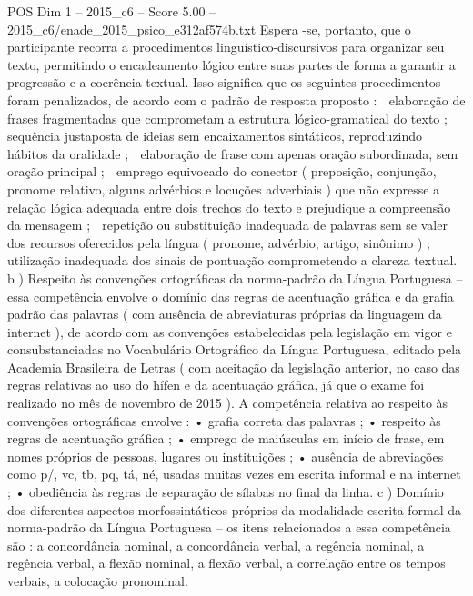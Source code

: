 \begin{textsample}{POS Dim 1 – 2015\_c6 – Score 5.00 – 2015\_c6/enade\_2015\_psico\_e312af574b.txt}
Espera -se, portanto, que o participante recorra a procedimentos linguístico-discursivos para organizar seu texto, permitindo o encadeamento lógico entre suas partes de forma a garantir a progressão e a coerência textual.
Isso significa que os seguintes procedimentos foram penalizados, de acordo com o padrão de resposta proposto :  elaboração de frases fragmentadas que comprometam a estrutura lógico-gramatical do texto ;  sequência justaposta de ideias sem encaixamentos sintáticos, reproduzindo hábitos da oralidade ;  elaboração de frase com apenas oração subordinada, sem oração principal ;  emprego equivocado do conector ( preposição, conjunção, pronome relativo, alguns advérbios e locuções adverbiais ) que não expresse a relação lógica adequada entre dois trechos do texto e prejudique a compreensão da mensagem ;  repetição ou substituição inadequada de palavras sem se valer dos recursos oferecidos pela língua ( pronome, advérbio, artigo, sinônimo ) ;  utilização inadequada dos sinais de pontuação comprometendo a clareza textual. b ) Respeito às convenções ortográficas da norma-padrão da Língua Portuguesa – essa competência envolve o domínio das regras de acentuação gráfica e da grafia padrão das palavras ( com ausência de abreviaturas próprias da linguagem da internet ), de acordo com as convenções estabelecidas pela legislação em vigor e consubstanciadas no Vocabulário Ortográfico da Língua Portuguesa, editado pela Academia Brasileira de Letras ( com aceitação da legislação anterior, no caso das regras relativas ao uso do hífen e da acentuação gráfica, já que o exame foi realizado no mês de novembro de 2015 ).
A competência relativa ao respeito às convenções ortográficas envolve : • grafia correta das palavras ; • respeito às regras de acentuação gráfica ; • emprego de maiúsculas em início de frase, em nomes próprios de pessoas, lugares ou instituições ; • ausência de abreviações como p/, vc, tb, pq, tá, né, usadas muitas vezes em escrita informal e na internet ; • obediência às regras de separação de sílabas no final da linha. c ) Domínio dos diferentes aspectos morfossintáticos próprios da modalidade escrita formal da norma-padrão da Língua Portuguesa – os itens relacionados a essa competência são : a concordância nominal, a concordância verbal, a regência nominal, a regência verbal, a flexão nominal, a flexão verbal, a correlação entre os tempos verbais, a colocação pronominal.

\end{textsample}
